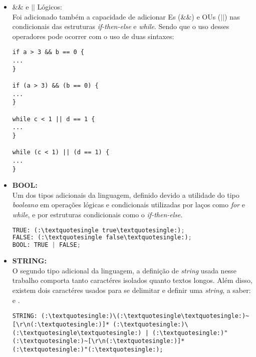\begin{itemize}
\begin{itemize}
            \begin{lstlisting}
COMMENT: (:\textquotesingle:)/*(:\textquotesingle:) .*? (:\textquotesingle:)*/(:\textquotesingle:) -> skip;
LINE_COMMENT: (:\textquotesingle:)//(:\textquotesingle:) ~[\r\n]* -> skip;]
            \end{lstlisting}
            
            		\item \&\& e $||$ Lógicos:\\
            			Foi adicionado também a capacidade de adicionar Es (\&\&) e OUs ($||$) nas condicionais das estruturas \textit{if-then-else} e \textit{while}. Sendo que o uso desses operadores pode ocorrer com o uso de duas sintaxes:
            			\begin{lstlisting}
if a > 3 && b == 0 {
...
}

if (a > 3) && (b == 0) {
...
}

while c < 1 || d == 1 {
...
}

while (c < 1) || (d == 1) {
...
}
					\end{lstlisting}
					
				\item \textbf{BOOL:}\\
                    Um dos tipos adicionais da linguagem, definido devido a utilidade do tipo \textit{booleano} em operações lógicas e condicionais utilizadas por laços como \textit{for} e \textit{while}, e por estruturas condicionais como o \textit{if-then-else}.

                    \begin{lstlisting}[language=python]
TRUE: (:\textquotesingle true\textquotesingle:);
FALSE: (:\textquotesingle false\textquotesingle:);
BOOL: TRUE | FALSE;
                    \end{lstlisting}

                \item \textbf{STRING:}\\
                    O segundo tipo adicional da linguagem, a definição de \textit{string} usada nesse trabalho comporta tanto caractéres isolados quanto textos longos. Além disso, existem dois caractéres usados para se delimitar e definir uma \textit{string}, a saber: \textquotesingle \vspace{0.1cm} e \textquotedbl.

                    \begin{lstlisting}
STRING: (:\textquotesingle:)\(:\textquotesingle\textquotesingle:)~[\r\n(:\textquotesingle:)]* (:\textquotesingle:)\(:\textquotesingle\textquotesingle:) | (:\textquotesingle:)"(:\textquotesingle:)~[\r\n(:\textquotesingle:)]*(:\textquotesingle:)"(:\textquotesingle:);
                    \end{lstlisting}
            \end{itemize}
			\end{itemize}			            